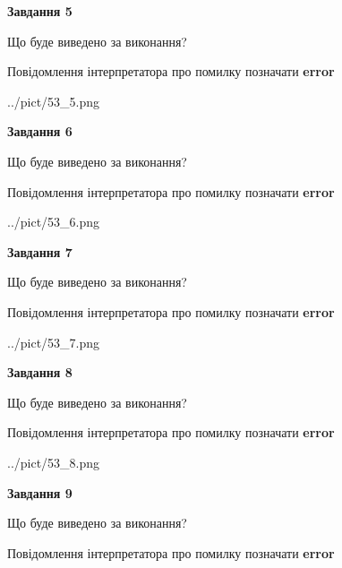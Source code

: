 \documentclass[11pt, ukrainian]{article}
\begin{document}
{\begin {large}
{\begin {center}\textbf{Завдання 5}\end {center}}\par
Що буде виведено за виконання? \par
Повідомлення інтерпретатора про помилку позначати \textbf{error}

\begin{center}
	{../pict/53_5.png}
\end{center}
\newpage

{\begin {center}\textbf{Завдання 6}\end {center}}\par
Що буде виведено за виконання? \par
Повідомлення інтерпретатора про помилку позначати \textbf{error}

\begin{center}
	{../pict/53_6.png}
\end{center}
\newpage

{\begin {center}\textbf{Завдання 7}\end {center}}\par
Що буде виведено за виконання? \par
Повідомлення інтерпретатора про помилку позначати \textbf{error}

\begin{center}
	{../pict/53_7.png}
\end{center}
\newpage

{\begin {center}\textbf{Завдання 8}\end {center}}\par
Що буде виведено за виконання? \par
Повідомлення інтерпретатора про помилку позначати \textbf{error}

\begin{center}
	{../pict/53_8.png}
\end{center}
\newpage

{\begin {center}\textbf{Завдання 9}\end {center}}\par
Що буде виведено за виконання? \par
Повідомлення інтерпретатора про помилку позначати \textbf{error}


\end{large}}
\end{document}

